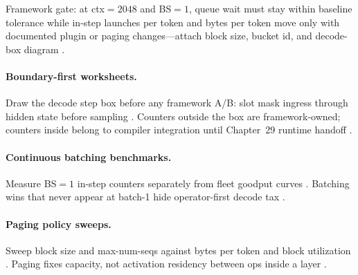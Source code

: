 \begin{example}
Framework gate: at ctx${=}2048$ and BS${=}1$, queue wait must stay within baseline tolerance while in-step launches per token and bytes per token move only with documented plugin or paging changes---attach block size, bucket id, and decode-box diagram \citep{kwon2023vllm,patel2025llminference,taxbreak2026,memoryfloor2026,yirage2026,chen2020compilerbasedhardw,liu2024deepseekv3,nvidia2024cudagraphs,dao2022flashattention,amd2024aie,amd2024xdna,dlbook,dao2023flashdecoding,nvidia2022hopper,semianalysis2024tma}.
\end{example}

\paragraph{Boundary-first worksheets.} Draw the decode step box before any framework A/B: slot mask ingress through hidden state before sampling \citep{kwon2023vllm,yirage2026,chen2020compilerbasedhardw,patel2025llminference,taxbreak2026,memoryfloor2026,dao2022flashattention,liu2024deepseekv3,nvidia2024cudagraphs,amd2024aie,amd2024xdna,dlbook,dao2023flashdecoding,nvidia2022hopper,semianalysis2024tma}. Counters outside the box are framework-owned; counters inside belong to compiler integration until Chapter~29 runtime handoff \citep{patel2025llminference,memoryfloor2026,yirage2026,chen2020compilerbasedhardw,kwon2023vllm,taxbreak2026,dlbook}.

\paragraph{Continuous batching benchmarks.} Measure BS${=}1$ in-step counters separately from fleet goodput curves \citep{kwon2023vllm,patel2025llminference,taxbreak2026,memoryfloor2026,yirage2026,chen2020compilerbasedhardw,liu2024deepseekv3,nvidia2024cudagraphs,dao2022flashattention,amd2024aie,amd2024xdna,dlbook,dao2023flashdecoding,nvidia2022hopper,semianalysis2024tma}. Batching wins that never appear at batch-1 hide operator-first decode tax \citep{patel2025llminference,kwon2023vllm,taxbreak2026,memoryfloor2026,yirage2026,chen2020compilerbasedhardw,dlbook}.

\paragraph{Paging policy sweeps.} Sweep block size and max-num-seqs against bytes per token and block utilization \citep{kwon2023vllm,patel2025llminference,memoryfloor2026,yirage2026,chen2020compilerbasedhardw,taxbreak2026,dao2022flashattention,liu2024deepseekv3,nvidia2024cudagraphs,amd2024aie,amd2024xdna,dlbook,dao2023flashdecoding,nvidia2022hopper,semianalysis2024tma}. Paging fixes capacity, not activation residency between ops inside a layer \citep{kwon2023vllm,memoryfloor2026,yirage2026,chen2020compilerbasedhardw,patel2025llminference,taxbreak2026,dlbook}.

